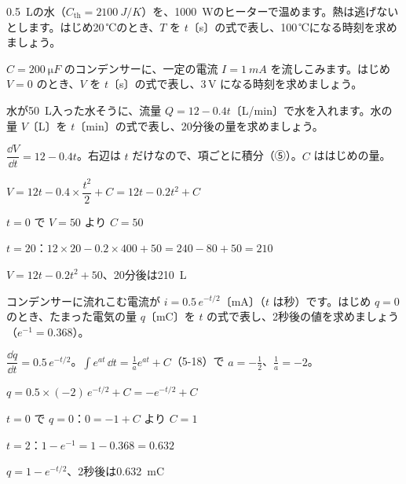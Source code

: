 \begingroup{}%
\noindent\begin{minipage}[t]{0.49\linewidth}
\begin{jibun}
\raggedright \qty{0.5}{L}の水（$C_{\mathrm{th}}=\qty{2100}{J/K}$）を、\qty{1000}{W}のヒーターで温めます。熱は逃げないとします。はじめ20\,℃のとき、$T$ を $t$〔s〕の式で表し、100\,℃になる時刻を求めましょう。
\end{jibun}
\end{minipage}\hfill
\begin{minipage}[t]{0.49\linewidth}
\begin{jibun}
\raggedright $C=\qty{200}{\micro F}$ のコンデンサーに、一定の電流 $I=\qty{1}{mA}$ を流しこみます。はじめ $V=0$ のとき、$V$ を $t$〔s〕の式で表し、3\,V になる時刻を求めましょう。
\end{jibun}
\end{minipage}\par
\endgroup

\begin{reidai}[時間で変わる流量]
水が\qty{50}{L}入った水そうに、流量 $Q=12-0.4t$〔L/min〕で水を入れます。水の量 $V$〔L〕を $t$〔min〕の式で表し、20分後の量を求めましょう。\par
\kangaekata $\dfrac{\dd V}{\dd t}=12-0.4t$。右辺は $t$ だけなので、項ごとに積分（⑤）。$C$ ははじめの量。\par
\shiki $V=12t-0.4\times\dfrac{t^2}{2}+C=12t-0.2t^2+C$\par
\bkvidl $t=0$ で $V=50$ より $C=50$\par
\bkvidl $t=20$：$12\times20-0.2\times400+50=240-80+50=210$\par
\kotae $V=12t-0.2t^2+50$、20分後は\qty{210}{L}
\end{reidai}

\begin{reidai}
コンデンサーに流れこむ電流が $i=0.5\,e^{-t/2}$〔mA〕（$t$ は秒）です。はじめ $q=0$ のとき、たまった電気の量 $q$〔mC〕を $t$ の式で表し、2秒後の値を求めましょう（$e^{-1}=0.368$）。\par
\kangaekata $\dfrac{\dd q}{\dd t}=0.5\,e^{-t/2}$。$\displaystyle\int e^{at}\,\dd t=\frac{1}{a}e^{at}+C$（5-18）で $a=-\frac{1}{2}$、$\frac{1}{a}=-2$。\par
\shiki $q=0.5\times(-2)\,e^{-t/2}+C=-e^{-t/2}+C$\par
\bkvidl $t=0$ で $q=0$：$0=-1+C$ より $C=1$\par
\bkvidl $t=2$：$1-e^{-1}=1-0.368=0.632$\par
\kotae $q=1-e^{-t/2}$、2秒後は\qty{0.632}{mC}
\end{reidai}

